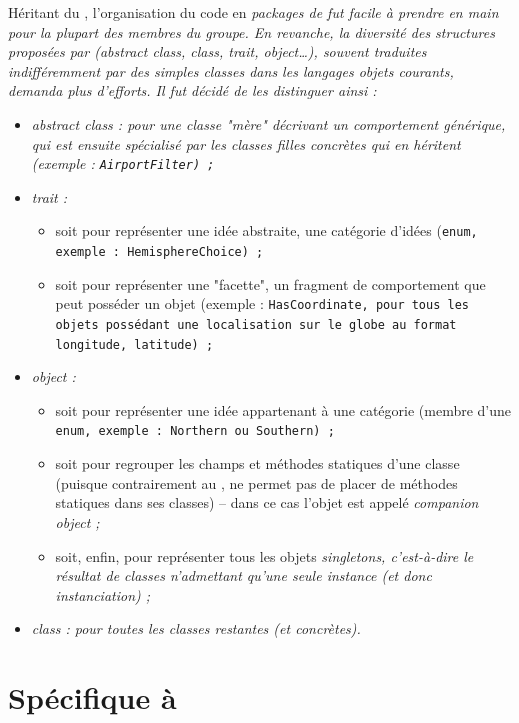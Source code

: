 \documentclass[a4paper, 12pt]{report}
\newcommand{\tech}[1]{\sf{#1}}
\newcommand{\en}[1]{\it{#1}}
\begin{document}
    Héritant du \tech{Java}, l'organisation du code en \en{package}s de \tech{Scala} fut facile à prendre en main pour la plupart des membres du groupe. En revanche, la diversité des structures proposées par \tech{Scala} (\en{abstract class}, \en{class}, \en{trait}, \en{object}\ldots{}), souvent traduites indifféremment par des simples \en{class}es dans les langages objets courants, demanda plus d'efforts. Il fut décidé de les distinguer ainsi :
    \begin{itemize}
        \item \en{abstract class} : pour une classe "mère" décrivant un comportement générique, qui est ensuite spécialisé par les classes filles concrètes qui en héritent (exemple : \tt{AirportFilter}) ;
        \item \en{trait} :
            \begin{itemize}
                \item soit pour représenter une idée abstraite, une catégorie d'idées (\tt{enum}, exemple : \tt{HemisphereChoice}) ;
                \item soit pour représenter une "facette", un fragment de comportement que peut posséder un objet (exemple : \tt{HasCoordinate}, pour tous les objets possédant une localisation sur le globe au format longitude, latitude) ;
            \end{itemize}
        \item \en{object} :
            \begin{itemize}
                \item soit pour représenter une idée appartenant à une catégorie (membre d'une \tt{enum}, exemple : \tt{Northern} ou \tt{Southern}) ;
                \item soit pour regrouper les champs et méthodes statiques d'une classe (puisque contrairement au \tech{Java}, \tech{Scala} ne permet pas de placer de méthodes statiques dans ses classes) -- dans ce cas l'objet est appelé \en{companion object} ;
                \item soit, enfin, pour représenter tous les objets \en{singleton}s, c'est-à-dire le résultat de classes n'admettant qu'une seule instance (et donc instanciation) ;
            \end{itemize}
        \item \en{class} : pour toutes les classes restantes (et concrètes).
    \end{itemize}
    
    \section{Spécifique à \tech{Scala}}
    
\end{document}
